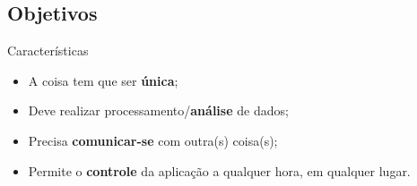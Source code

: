 \subsection*{Objetivos}
\begin{frame}{}
	\begin{block}{Características}	
		\begin{itemize}
			\item A coisa tem que ser \textbf{única};
			\item Deve realizar processamento/\textbf{análise} de dados;
			\item Precisa \textbf{comunicar-se} com outra(s) coisa(s);
			\item Permite o \textbf{controle} da aplicação a qualquer hora, em qualquer lugar.
		\end{itemize}
	\end{block}
\end{frame}